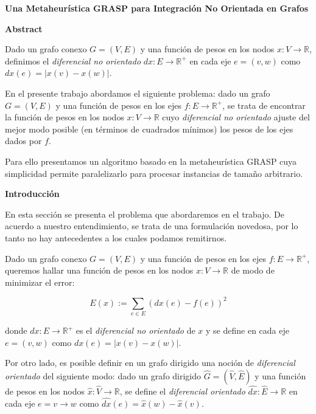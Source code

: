 \documentclass[a4paper,11pt]{article}
\begin{document}
\textbf{Una Metaheurística GRASP para Integración No Orientada en Grafos}

\bigskip

\textbf{Abstract}
 
\bigskip

Dado un grafo conexo $G=(V,E)$ y una función de pesos en los nodos $x: V 
\rightarrow \mathbb{R}$, definimos el \textit{diferencial no orientado} 
$dx: E \rightarrow \mathbb{R}^+$ en cada eje $e=(v,w)$ como $dx(e) = 
|x(v) - x(w)|$.

\smallskip

En el presente trabajo abordamos el siguiente problema: dado un grafo 
$G=(V,E)$ y una función de pesos en los ejes $f: E \rightarrow 
\mathbb{R}^+$, se trata de encontrar la función de pesos en los nodos 
$x: V \rightarrow \mathbb{R}$ cuyo \textit{diferencial no orientado} 
ajuste del mejor modo posible (en términos de cuadrados mínimos) los 
pesos de los ejes dados por $f$.

\smallskip

Para ello presentamos un algoritmo basado en la metaheurística GRASP 
cuya simplicidad permite paralelizarlo para procesar instancias de 
tamaño arbitrario.

\bigskip

\textbf{Introducción}

\bigskip

En esta sección se presenta el problema que abordaremos en el trabajo. 
De acuerdo a nuestro entendimiento, se trata de una formulación 
novedosa, por lo tanto no hay antecedentes a los cuales podamos 
remitirnos.

\bigskip

Dado un grafo conexo $G=(V,E)$ y una función de pesos en los ejes 
$f: E \rightarrow \mathbb{R}^+$, queremos hallar una función de pesos 
en los nodos $x: V \rightarrow \mathbb{R}$ de modo de minimizar el 
error:

$$E(x) := \sum_{e \in E} (dx(e) - f(e))^2$$

donde $dx: E \rightarrow \mathbb{R}^+$ es el \textit{diferencial 
no orientado} de $x$ y se define en cada eje $e=(v,w)$ como $dx(e) = 
|x(v) - x(w)|$.

\bigskip

Por otro lado, es posible definir en un grafo dirigido una noción de 
\textit{diferencial orientado} del siguiente modo: dado un grafo 
dirigido $\hat G=(\hat V,\hat E)$ y una función de pesos en los nodos 
$\hat x: \hat V \rightarrow \mathbb{R}$, se define el 
\textit{diferencial orientado} $\hat{dx}: \hat E \rightarrow \mathbb{R}$ 
en cada eje $e=v \rightarrow w$ como $\hat{dx}(e) = \hat x(w) - 
\hat x(v)$.
\end{document}
